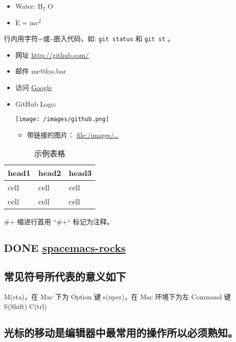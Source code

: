 \documentclass[11pt]{ctexart}
\begin{document}
\begin{itemize}
\item Water: H\(_{\text{2}}\) O
\item E = mc\(^{\text{2}}\)
\end{itemize}

行内用字符=或\textasciitilde{}嵌入代码，如:
\texttt{git status} 和 \texttt{git st} 。



\begin{itemize}
\item 网址 \url{http://github.com/}
\item 邮件 me@foo.bar

\item 访问 \href{http://google.com}{Google}

\item GitHub Logo: \begin{center}
\texttt{[image: /images/github.png]}
\end{center}
\begin{itemize}
\item 带链接的图片：
\href{https://github.com/}{file:/images/\ldots{}}
\end{itemize}
\end{itemize}

\begin{table}[htbp]
\caption{\label{tab:org58bb1e4}
示例表格}
\centering
\begin{tabular}{lll}
head1 & head2 & head3\\
\hline
cell & cell & cell\\
cell & cell & cell\\
\end{tabular}
\end{table}

\#+ 缩进行首用 ``\#+`` 标记为注释。

\subsection{{\bfseries\sffamily DONE} \href{https://github.com/emacs-china/Spacemacs-rocks}{spacemacs-rocks}}
\label{sec:org0d0f6b2}
\subsection{常见符号所代表的意义如下}
\label{sec:orgc9097eb}

M(eta)，在 Mac 下为 Option 键
s(uper)，在 Mac 环境下为左 Command 键
S(Shift)
C(trl)
\subsection{光标的移动是编辑器中最常用的操作所以必须熟知。}
\label{sec:org05540bc}
\end{document}
